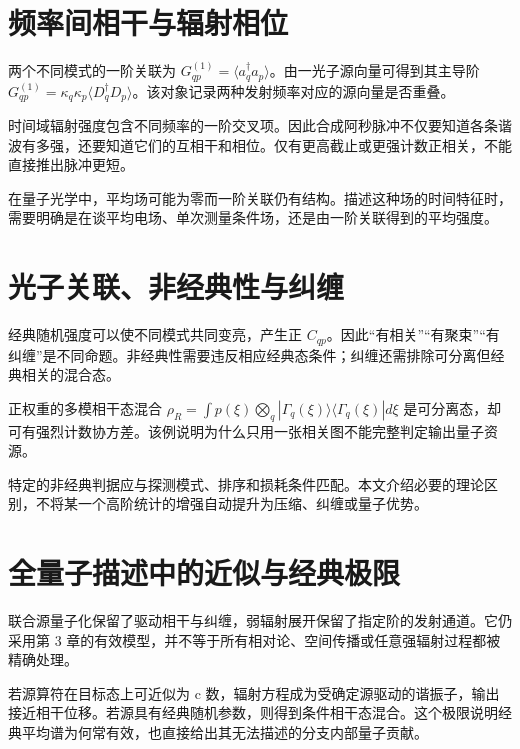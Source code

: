 \documentclass[UTF8,a4paper,zihao=-4,openany,fontset=fandol]{ctexbook}
\begin{document}
\section{频率间相干与辐射相位}\label{sec:08:8}


两个不同模式的一阶关联为 $G_{qp}^{(1)}=\langle a_q^\dagger a_p\rangle$。由一光子源向量可得到其主导阶 $G_{qp}^{(1)}=\kappa_q\kappa_p\langle D_q^\dagger D_p\rangle$。该对象记录两种发射频率对应的源向量是否重叠。



时间域辐射强度包含不同频率的一阶交叉项。因此合成阿秒脉冲不仅要知道各条谐波有多强，还要知道它们的互相干和相位。仅有更高截止或更强计数正相关，不能直接推出脉冲更短。



在量子光学中，平均场可能为零而一阶关联仍有结构。描述这种场的时间特征时，需要明确是在谈平均电场、单次测量条件场，还是由一阶关联得到的平均强度。



\section{光子关联、非经典性与纠缠}\label{sec:08:9}


经典随机强度可以使不同模式共同变亮，产生正 $C_{qp}$。因此“有相关”“有聚束”“有纠缠”是不同命题。非经典性需要违反相应经典态条件；纠缠还需排除可分离但经典相关的混合态。



正权重的多模相干态混合 $\rho_R=\int p(\xi)\bigotimes_q|\Gamma_q(\xi)\rangle\langle\Gamma_q(\xi)|d\xi$ 是可分离态，却可有强烈计数协方差。该例说明为什么只用一张相关图不能完整判定输出量子资源。



特定的非经典判据应与探测模式、排序和损耗条件匹配。本文介绍必要的理论区别，不将某一个高阶统计的增强自动提升为压缩、纠缠或量子优势。



\section{全量子描述中的近似与经典极限}\label{sec:08:10}


联合源量子化保留了驱动相干与纠缠，弱辐射展开保留了指定阶的发射通道。它仍采用第 3 章的有效模型，并不等于所有相对论、空间传播或任意强辐射过程都被精确处理。



若源算符在目标态上可近似为 c 数，辐射方程成为受确定源驱动的谐振子，输出接近相干位移。若源具有经典随机参数，则得到条件相干态混合。这个极限说明经典平均谱为何常有效，也直接给出其无法描述的分支内部量子贡献。
\end{document}
